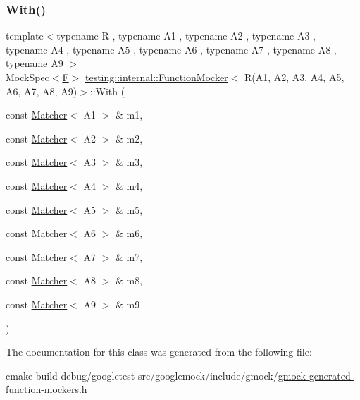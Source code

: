 \subsubsection{\texorpdfstring{With()}{With()}}
{\footnotesize\ttfamily template$<$typename R , typename A1 , typename A2 , typename A3 , typename A4 , typename A5 , typename A6 , typename A7 , typename A8 , typename A9 $>$ \\
Mock\+Spec$<$\mbox{\hyperlink{classtesting_1_1internal_1_1FunctionMocker_3_01R_07A1_00_01A2_00_01A3_00_01A4_00_01A5_00_01A6_00_01A7_00_01A8_00_01A9_08_4_a8de64ec5559bd4e4410a4374e9c93e4e}{F}}$>$ \mbox{\hyperlink{classtesting_1_1internal_1_1FunctionMocker}{testing\+::internal\+::\+Function\+Mocker}}$<$ R(A1, A2, A3, A4, A5, A6, A7, A8, A9)$>$\+::With (\begin{DoxyParamCaption}\item[{const \mbox{\hyperlink{classtesting_1_1Matcher}{Matcher}}$<$ A1 $>$ \&}]{m1,  }\item[{const \mbox{\hyperlink{classtesting_1_1Matcher}{Matcher}}$<$ A2 $>$ \&}]{m2,  }\item[{const \mbox{\hyperlink{classtesting_1_1Matcher}{Matcher}}$<$ A3 $>$ \&}]{m3,  }\item[{const \mbox{\hyperlink{classtesting_1_1Matcher}{Matcher}}$<$ A4 $>$ \&}]{m4,  }\item[{const \mbox{\hyperlink{classtesting_1_1Matcher}{Matcher}}$<$ A5 $>$ \&}]{m5,  }\item[{const \mbox{\hyperlink{classtesting_1_1Matcher}{Matcher}}$<$ A6 $>$ \&}]{m6,  }\item[{const \mbox{\hyperlink{classtesting_1_1Matcher}{Matcher}}$<$ A7 $>$ \&}]{m7,  }\item[{const \mbox{\hyperlink{classtesting_1_1Matcher}{Matcher}}$<$ A8 $>$ \&}]{m8,  }\item[{const \mbox{\hyperlink{classtesting_1_1Matcher}{Matcher}}$<$ A9 $>$ \&}]{m9 }\end{DoxyParamCaption})\hspace{0.3cm}{\ttfamily [inline]}}



The documentation for this class was generated from the following file\+:\begin{DoxyCompactItemize}
\item 
cmake-\/build-\/debug/googletest-\/src/googlemock/include/gmock/\mbox{\hyperlink{gmock-generated-function-mockers_8h}{gmock-\/generated-\/function-\/mockers.\+h}}\end{DoxyCompactItemize}
